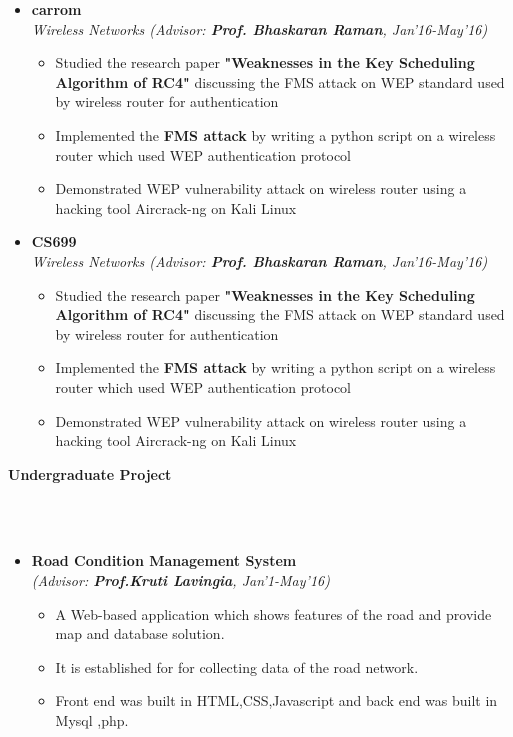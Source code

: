 \documentclass[a4paper,10pt]{article}
\newcommand{\isep}{-2 pt}
\newcommand{\lsep}{-0.5cm}
\newcommand{\resheading}[1]{{\small \colorbox{mygrey}{\begin{minipage}{0.975\textwidth}{\textbf{#1 \vphantom{p\^{E}}}}\end{minipage}}}}
\begin{document}
\begin{itemize}
\item \textbf{carrom } \\
\emph{Wireless Networks (Advisor: \textbf{Prof. Bhaskaran Raman}, Jan'16-May'16)}\\[-0.6cm]
      \begin{itemize}\itemsep \isep
	    \item Studied the research paper {\bf "Weaknesses in the Key Scheduling Algorithm of RC4"} discussing the FMS attack on WEP standard used by wireless router for authentication
		\item Implemented the {\bf FMS attack} by writing a python script on a wireless router which used WEP authentication protocol
		\item Demonstrated WEP vulnerability attack on wireless router using a hacking tool Aircrack-ng on Kali Linux
      \end{itemize}
\end{itemize}
\begin{itemize}
\item \textbf{CS699} \\
\emph{Wireless Networks (Advisor: \textbf{Prof. Bhaskaran Raman}, Jan'16-May'16)}\\[-0.6cm]
      \begin{itemize}\itemsep \isep
	    \item Studied the research paper {\bf "Weaknesses in the Key Scheduling Algorithm of RC4"} discussing the FMS attack on WEP standard used by wireless router for authentication
		\item Implemented the {\bf FMS attack} by writing a python script on a wireless router which used WEP authentication protocol
		\item Demonstrated WEP vulnerability attack on wireless router using a hacking tool Aircrack-ng on Kali Linux
      \end{itemize}
\end{itemize}





\clearpage

\resheading{\textbf{\large Undergraduate Project} }\\[\lsep]\\[-0.3cm]
\begin{itemize}
\item \textbf{Road Condition Management System}\\
 \emph{(Advisor: \textbf{Prof.Kruti Lavingia}, Jan'1-May'16)} \\[-0.6cm]
      \begin{itemize}\itemsep \isep
	    \item A Web-based application which shows features of the road and provide map and database solution.
		 \item It is established for for collecting data of the road network. 
		 \item Front end was built in HTML,CSS,Javascript  and back end was built in Mysql ,php.
\end{itemize}
\end{itemize}
\end{document}

